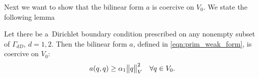 % 
%
Next we want to show that the bilinear form $a$ is coercive on $V_0$.
We state the following lemma
\begin{lemma} \label{lem:prim_form_a_coercivity_V0}
    Let there be a~Dirichlet boundary condition prescribed on any non\-empty subset of $\Gamma_{dD}$, $d=1,2$.
    Then the bilinear form $a$, defined in \eqref{eqn:prim_weak_form}, is coercive on $V_0$:
    \begin{equation} \label{eqn:prim_form_a_coercivity_V0}
        a(q,q) \geq \alpha_1\bigl\Vert q\bigr\Vert^2_V \quad \forall q\in V_0.
    \end{equation}
\end{lemma}

